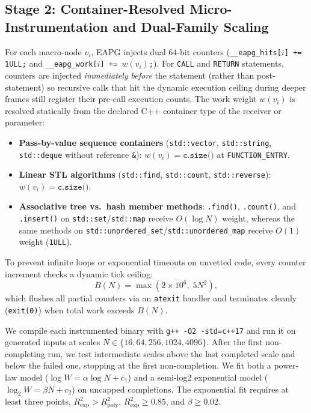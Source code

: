 \subsection{Stage 2: Container-Resolved Micro-Instrumentation and Dual-Family Scaling}
For each macro-node $v_i$, EAPG injects dual 64-bit counters (\texttt{\_\_eapg\_hits[$i$] += 1ULL;} and \texttt{\_\_eapg\_work[$i$] += $w(v_i)$;}). For \texttt{CALL} and \texttt{RETURN} statements, counters are injected \emph{immediately before} the statement (rather than post-statement) so recursive calls that hit the dynamic execution ceiling during deeper frames still register their pre-call execution counts. The work weight $w(v_i)$ is resolved statically from the declared C++ container type of the receiver or parameter:
\begin{itemize}
    \item \textbf{Pass-by-value sequence containers} (\texttt{std::vector}, \texttt{std::string}, \texttt{std::deque} without reference \texttt{\&}): $w(v_i) = \texttt{c.size()}$ at \texttt{FUNCTION\_ENTRY}.
    \item \textbf{Linear STL algorithms} (\texttt{std::find}, \texttt{std::count}, \texttt{std::reverse}): $w(v_i) = \texttt{c.size()}$.
    \item \textbf{Associative tree vs.\ hash member methods}: \texttt{.find()}, \texttt{.count()}, and \texttt{.insert()} on \texttt{std::set}/\texttt{std::map} receive $O(\log N)$ weight, whereas the same methods on \texttt{std::unordered\_set}/\texttt{std::unordered\_map} receive $O(1)$ weight (\texttt{1ULL}).
\end{itemize}
To prevent infinite loops or exponential timeouts on unvetted code, every counter increment checks a dynamic tick ceiling:
\begin{equation}
B(N) = \max\!\left(2 \times 10^6,\; 5N^2\right),
\end{equation}
which flushes all partial counters via an \texttt{atexit} handler and terminates cleanly (\texttt{exit(0)}) when total work exceeds $B(N)$.

We compile each instrumented binary with \texttt{g++ -O2 -std=c++17} and run it on generated inputs at scales $N \in \{16,64,256,1024,4096\}$. After the first non-completing run, we test intermediate scales above the last completed scale and below the failed one, stopping at the first non-completion. We fit both a power-law model ($\log W = \alpha \log N + c_1$) and a semi-log2 exponential model ($\log_2 W = \beta N + c_2$) on uncapped completions. The exponential fit requires at least three points, $R^2_{\text{exp}} > R^2_{\text{poly}}$, $R^2_{\text{exp}} \ge 0.85$, and $\beta \ge 0.02$.

